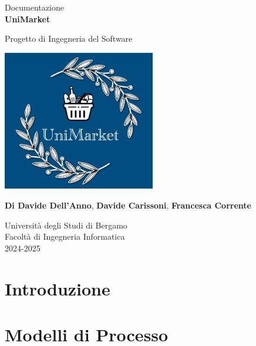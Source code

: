 \documentclass[a4paper,12pt]{article}
\begin{document}
\begin{titlepage}
    \centering
    \vspace*{2cm}
    
    \vspace{1.5cm}
    
    \large Documentazione\\
    \Huge
    \textbf{UniMarket}
    
    \vspace{1.5cm}
    
    \LARGE
    Progetto di Ingegneria del Software
    
    \vspace{1.5cm}
    \includegraphics[width=0.5\textwidth]{../Media/logo.jpeg}
    
    \vspace{1.5cm}
    \small
    \textbf{Di Davide Dell'Anno}, \textbf{Davide Carissoni}, \textbf{Francesca Corrente}
    
    \vspace{1.5cm}
    
    \Large
    Università degli Studi di Bergamo \\
    Facoltà di Ingegneria Informatica \\
    2024-2025
    
\end{titlepage}

\renewcommand{\contentsname}{Indice}
\newpage
\tableofcontents
\newpage

\section{Introduzione} %

\section{Modelli di Processo} %
\end{document}
